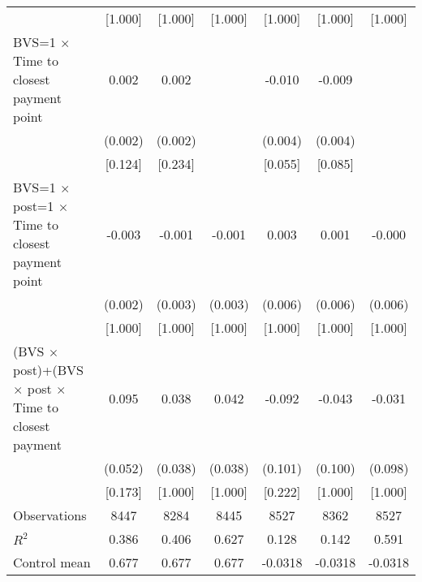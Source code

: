 {\begin{tabular}{l*{6}{c}}
                    &     [1.000]         &     [1.000]         &     [1.000]         &     [1.000]         &     [1.000]         &     [1.000]         \\
BVS=1 $\times$ Time to closest payment point&       0.002         &       0.002         &                     &      -0.010\sym{**} &      -0.009\sym{**} &                     \\
                    &     (0.002)         &     (0.002)         &                     &     (0.004)         &     (0.004)         &                     \\
                    &     [0.124]         &     [0.234]         &                     &     [0.055]         &     [0.085]         &                     \\
BVS=1 $\times$ post=1 $\times$ Time to closest payment point&      -0.003         &      -0.001         &      -0.001         &       0.003         &       0.001         &      -0.000         \\
                    &     (0.002)         &     (0.003)         &     (0.003)         &     (0.006)         &     (0.006)         &     (0.006)         \\
                    &     [1.000]         &     [1.000]         &     [1.000]         &     [1.000]         &     [1.000]         &     [1.000]         \\
\hline (BVS $\times$ post)+(BVS $\times$  post $\times$ Time to closest payment &       0.095\sym{*}  &       0.038         &       0.042         &      -0.092         &      -0.043         &      -0.031         \\
                    &     (0.052)         &     (0.038)         &     (0.038)         &     (0.101)         &     (0.100)         &     (0.098)         \\
                    &     [0.173]         &     [1.000]         &     [1.000]         &     [0.222]         &     [1.000]         &     [1.000]         \\
\midrule
Observations        &        8447         &        8284         &        8445         &        8527         &        8362         &        8527         \\
\(R^{2}\)           &       0.386         &       0.406         &       0.627         &       0.128         &       0.142         &       0.591         \\
Control mean        &       0.677         &       0.677         &       0.677         &     -0.0318         &     -0.0318         &     -0.0318         \\

\end{tabular}}
